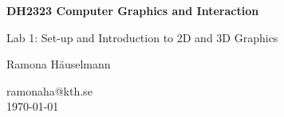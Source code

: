 \begin{titlepage}
\begin{center}
	\vspace{3em}	
    {\Huge\bfseries DH2323 Computer Graphics and Interaction\par}
    \vspace{2em}
    {\huge Lab 1: Set-up and Introduction to 2D and 3D Graphics \par}
    \vspace{3em}
    {\Large Ramona Häuselmann\par}
	\vspace{1em}
    ramonaha@kth.se\\
	\vspace{1em}
    \today
\end{center}
\end{titlepage}